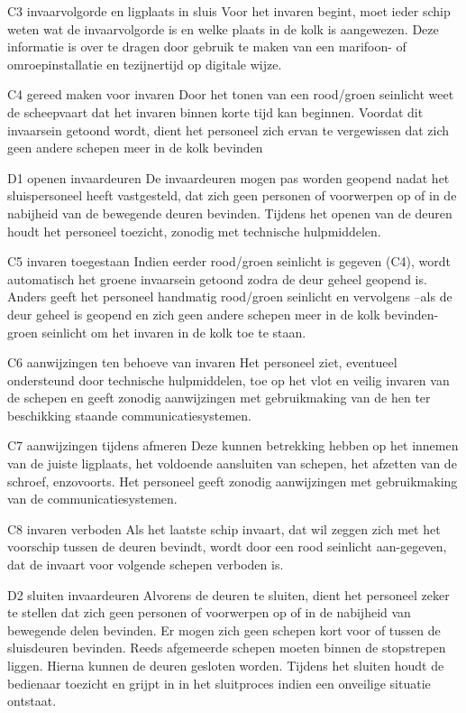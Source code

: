 C3 invaarvolgorde en ligplaats in sluis
Voor het invaren begint, moet ieder schip weten wat de invaarvolgorde is en welke plaats
in de kolk is aangewezen. Deze informatie is over te dragen door gebruik te maken van
een marifoon- of omroepinstallatie en tezijnertijd op digitale wijze.

C4 gereed maken voor invaren
Door het tonen van een rood/groen seinlicht weet de scheepvaart dat het invaren binnen
korte tijd kan beginnen. Voordat dit invaarsein getoond wordt, dient het personeel zich
ervan te vergewissen dat zich geen andere schepen meer in de kolk bevinden

D1 openen invaardeuren
De invaardeuren mogen pas worden geopend nadat het sluispersoneel heeft vastgesteld,
dat zich geen personen of voorwerpen op of in de nabijheid van de bewegende deuren
bevinden. Tijdens het openen van de deuren houdt het personeel toezicht, zonodig met
technische hulpmiddelen.


C5 invaren toegestaan
Indien eerder rood/groen seinlicht is gegeven (C4), wordt automatisch het groene
invaarsein getoond zodra de deur geheel geopend is. Anders geeft het personeel handmatig rood/groen seinlicht en vervolgens –als de deur geheel is geopend en zich geen
andere schepen meer in de kolk bevinden- groen seinlicht om het invaren in de kolk toe
te staan.

C6 aanwijzingen ten behoeve van invaren
Het personeel ziet, eventueel ondersteund door technische hulpmiddelen, toe op het
vlot en veilig invaren van de schepen en geeft zonodig aanwijzingen met gebruikmaking
van de hen ter beschikking staande communicatiesystemen.

C7 aanwijzingen tijdens afmeren
Deze kunnen betrekking hebben op het innemen van de juiste ligplaats, het voldoende
aansluiten van schepen, het afzetten van de schroef, enzovoorts. Het personeel geeft
zonodig aanwijzingen met gebruikmaking van de communicatiesystemen.

C8 invaren verboden
Als het laatste schip invaart, dat wil zeggen zich met het voorschip tussen de deuren
bevindt, wordt door een rood seinlicht aan-gegeven, dat de invaart voor volgende
schepen verboden is.

D2 sluiten invaardeuren
Alvorens de deuren te sluiten, dient het personeel zeker te stellen dat zich geen personen
of voorwerpen op of in de nabijheid van bewegende delen bevinden. Er mogen zich geen
schepen kort voor of tussen de sluisdeuren bevinden. Reeds afgemeerde schepen
moeten binnen de stopstrepen liggen. Hierna kunnen de deuren gesloten worden.
Tijdens het sluiten houdt de bedienaar toezicht en grijpt in in het sluitproces indien een
onveilige situatie ontstaat.

